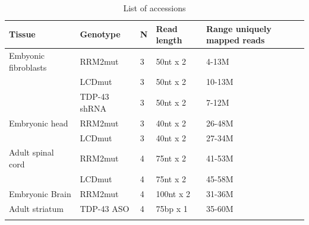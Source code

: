 \begin{table}[h!]
	\caption{List of accessions}
	\begin{footnotesize}
		\begin{tabular}{lllll}
		Tissue & Genotype & N &	Read length & Range uniquely mapped reads\\
		\hline	
		Embyonic fibroblasts & RRM2mut &3 &50nt	x 2 & 4-13M\\
			& LCDmut & 3 & 50nt	x	2 & 10-13M\\
			& TDP-43 shRNA & 3 & 50nt x 2 & 7-12M\\
		Embryonic head & RRM2mut & 3 & 40nt	x	2 & 26-48M\\
			& LCDmut & 3 & 40nt	x 2 & 27-34M \\
		Adult	spinal	cord & RRM2mut & 4 & 75nt x	2 & 41-53M\\
			& LCDmut & 4 & 75nt x 2 & 45-58M\\
		Embryonic	Brain	& RRM2mut & 4 & 100nt x 2 & 31-36M\\
		Adult striatum & TDP-43 ASO & 4 & 75bp x 1 & 35-60M\\
		\citep{Polymenidou2011-hs}
		\end{tabular}
	\end{footnotesize}
\end{table}